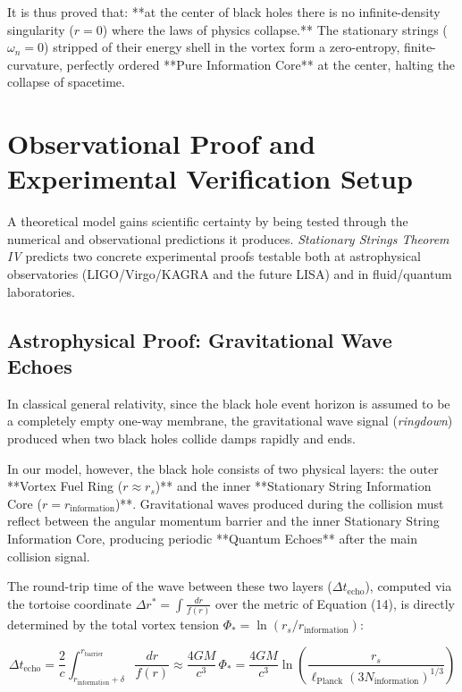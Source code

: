 \documentclass[12pt,a4paper]{article}
\begin{document}
It is thus proved that: **at the center of black holes there is no infinite-density singularity ($r=0$) where the laws of physics collapse.** The stationary strings ($\omega_n = 0$) stripped of their energy shell in the vortex form a zero-entropy, finite-curvature, perfectly ordered **Pure Information Core** at the center, halting the collapse of spacetime.

\section{Observational Proof and Experimental Verification Setup}

A theoretical model gains scientific certainty by being tested through the numerical and observational predictions it produces. \textit{Stationary Strings Theorem IV} predicts two concrete experimental proofs testable both at astrophysical observatories (LIGO/Virgo/KAGRA and the future LISA) and in fluid/quantum laboratories.

\subsection{Astrophysical Proof: Gravitational Wave Echoes}

In classical general relativity, since the black hole event horizon is assumed to be a completely empty one-way membrane, the gravitational wave signal (\textit{ringdown}) produced when two black holes collide damps rapidly and ends.

In our model, however, the black hole consists of two physical layers: the outer **Vortex Fuel Ring ($r \approx r_s$)** and the inner **Stationary String Information Core ($r = r_{\text{information}}$)**. Gravitational waves produced during the collision must reflect between the angular momentum barrier and the inner Stationary String Information Core, producing periodic **Quantum Echoes** after the main collision signal.

The round-trip time of the wave between these two layers ($\Delta t_{\text{echo}}$), computed via the tortoise coordinate $\Delta r^* = \int \frac{dr}{f(r)}$ over the metric of Equation (14), is directly determined by the total vortex tension $\Phi_* = \ln(r_s / r_{\text{information}})$:

\begin{equation}
\Delta t_{\text{echo}} = \frac{2}{c} \int_{r_{\text{information}} + \delta}^{r_{\text{barrier}}} \frac{dr}{f(r)} \approx \frac{4 G M}{c^3} \, \Phi_* = \frac{4 G M}{c^3} \ln\left( \frac{r_s}{\ell_{\text{Planck}} (3 N_{\text{information}})^{1/3}} \right)
\end{equation}
\end{document}
